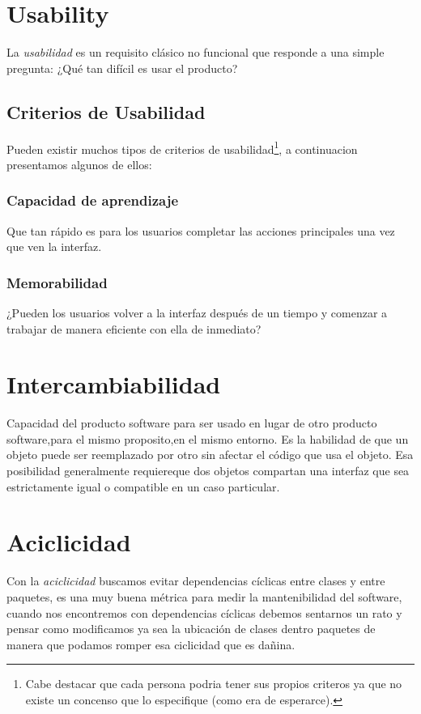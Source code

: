 \documentclass[a4paper,11pt]{article}
\begin{document}
\section{Usability}
La \emph{usabilidad} es un requisito clásico no funcional\cite{USABILITY} que 
responde a una simple pregunta: ¿Qué tan difícil es usar el producto?

\subsection{Criterios de Usabilidad}
Pueden existir muchos tipos de criterios de usabilidad\footnote{Cabe destacar 
que cada persona podria tener sus propios criteros ya que no existe un concenso 
que lo especifique (como era de esperarce).}, a continuacion presentamos 
algunos de ellos:

\subsubsection{Capacidad de aprendizaje}
Que tan rápido es para los usuarios completar las acciones principales una vez 
que ven la interfaz.

\subsubsection{Memorabilidad}
¿Pueden los usuarios volver a la interfaz después de un tiempo y comenzar a 
trabajar de manera eficiente con ella de inmediato?

\section{Intercambiabilidad}
Capacidad del producto software para ser usado en lugar de otro producto 
software,para el mismo proposito,en el mismo entorno. Es la habilidad de que un 
objeto puede ser reemplazado por otro sin afectar el código que usa el objeto.  
Esa posibilidad generalmente requiereque dos objetos compartan una interfaz que 
sea estrictamente igual o compatible en un caso particular.

\section{Aciclicidad}
Con la \emph{aciclicidad} buscamos evitar dependencias cíclicas entre clases y 
entre paquetes, es una muy buena métrica para medir la mantenibilidad del 
software, cuando nos encontremos con dependencias cíclicas debemos sentarnos un 
rato y pensar como modificamos ya sea la ubicación de clases dentro paquetes de 
manera que podamos romper esa ciclicidad que es dañina.  
  
\end{document}
